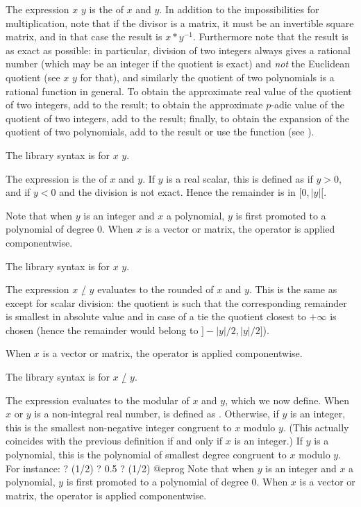\subseckbd{/} The expression $x$ \kbd{/} $y$ is the  of $x$
and $y$. In addition to the impossibilities for multiplication, note that if
the divisor is a matrix, it must be an invertible square matrix, and in that
case the result is $x*y^{-1}$. Furthermore note that the result is as exact
as possible: in particular, division of two integers always gives a rational
number (which may be an integer if the quotient is exact) and \emph{not} the
Euclidean quotient (see $x$ \kbd{\bs} $y$ for that), and similarly the
quotient of two polynomials is a rational function in general. To obtain the
approximate real value of the quotient of two integers, add  to the
result; to obtain the approximate $p$-adic value of the quotient of two
integers, add  to the result; finally, to obtain the
 expansion of the quotient of two polynomials, add
 to the result or use the  function
(see ). \label{se:gdiv}

The library syntax is  for $x$ \kbd{/} $y$.

\subseckbd{\bs} The expression  is the
 of $x$ and $y$. If $y$ is a real scalar, this is
defined as  if $y > 0$, and  if
$y < 0$ and the division is not exact. Hence the remainder
 is in $[0, |y|[$.

Note that when $y$ is an integer and $x$ a polynomial, $y$ is first promoted
to a polynomial of degree $0$. When $x$ is a vector or matrix, the operator
is applied componentwise.

The library syntax is 
for $x$ \kbd{\bs} $y$.

\subseckbd{\bs/} The expression $x$ \b{/} $y$ evaluates to the rounded
 of $x$ and $y$. This is the same as 
except for scalar division: the quotient is such that the corresponding
remainder is smallest in absolute value and in case of a tie the quotient
closest to $+\infty$ is chosen (hence the remainder would belong to
$]{-}|y|/2, |y|/2]$).

When $x$ is a vector or matrix, the operator is applied componentwise.

The library syntax is 
for $x$ \b{/} $y$.

\subseckbd{\%} The expression  evaluates to the modular
 of $x$ and $y$, which we now define. When $x$ or $y$
is a non-integral real number,  is defined as
. Otherwise, if $y$ is an integer, this is
the smallest
non-negative integer congruent to $x$ modulo $y$. (This actually coincides
with the previous definition if and only if $x$ is an integer.) If $y$ is a
polynomial, this is the polynomial of smallest degree congruent to
$x$ modulo $y$. For instance:
\bprog
? (1/2) %
? 0.5 %
? (1/2) %
@eprog
Note that when $y$ is an integer and $x$ a polynomial, $y$ is first promoted
to a polynomial of degree $0$. When $x$ is a vector or matrix, the operator
is applied componentwise.

